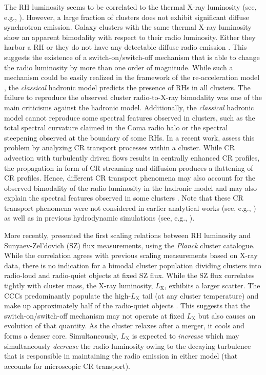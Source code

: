 \documentclass[traditabstract]{aa}
\newcommand{\rmn}{\mathrm}
\begin{document}
The RH luminosity seems to be correlated to the thermal X-ray luminosity (see,
e.g., \citealp{2009A&A...507..661B,2011A&A...527A..99E}).  However, a large
fraction of clusters does not exhibit significant diffuse synchrotron
emission. Galaxy clusters with the same thermal X-ray luminosity show an
apparent bimodality with respect to their radio luminosity. Either they harbor a
RH or they do not have any detectable diffuse radio emission
\citep{2009A&A...507..661B,2011A&A...527A..99E}.  This suggests the existence
of a switch-on/switch-off mechanism that is able to change the radio luminosity
by more than one order of magnitude.  While such a mechanism could be easily
realized in the framework of the re-acceleration model
\citep{2009A&A...507..661B}, the \emph{classical} hadronic model predicts the
presence of RHs in all clusters. The failure to reproduce the observed cluster
radio-to-X-ray bimodality was one of the main criticisms against the hadronic
model. Additionally, the \emph{classical} hadronic model cannot reproduce some
spectral features observed in clusters, such as the total spectral curvature
claimed in the Coma radio halo or the spectral steepening observed at the
boundary of some RHs. In a recent work, \cite{2011A&A...527A..99E} assess this
problem by analyzing CR transport processes within a cluster. While CR advection
with turbulently driven flows results in centrally enhanced CR profiles, the
propagation in form of CR streaming and diffusion produces a flattening of CR
profiles. Hence, different CR transport phenomena may also account for the
observed bimodality of the radio luminosity in the hadronic model and may also
explain the spectral features observed in some clusters
\citep{2011A&A...527A..99E}. Note that these CR transport phenomena were not
considered in earlier analytical works (see, e.g., \citealp{2004A&A...413...17P})
as well as in previous hydrodynamic simulations (see,
e.g., \citealp{2001ApJ...562..233M, 2008MNRAS.385.1211P, 2010MNRAS.409..449P}).

More recently, \cite{2012MNRAS.421L.112B} presented the first scaling relations
between RH luminosity and Sunyaev-Zel'dovich (SZ) flux measurements, using the
\emph{Planck} cluster catalogue. While the correlation agrees with previous
scaling measurements based on X-ray data, there is no indication for a bimodal
cluster population dividing clusters into radio-loud and radio-quiet objects at
fixed SZ flux. While the SZ flux correlates tightly with cluster mass, the X-ray
luminosity, $L_\rmn{X}$, exhibits a larger scatter. The CCCs predominantly
populate the high-$L_\rmn{X}$ tail (at any cluster temperature) and make up
approximately half of the radio-quiet objects \citep{2011A&A...527A..99E}. This
suggests that the switch-on/switch-off mechanism may not operate at fixed
$L_\rmn{X}$ but also causes an evolution of that quantity. As the cluster
relaxes after a merger, it cools and forms a denser core. Simultaneously,
$L_\rmn{X}$ is expected to {\em increase} which may simultaneously {\em
  decrease} the radio luminosity owing to the decaying turbulence that is
responsible in maintaining the radio emission in either model (that accounts for
microscopic CR transport).
 
\end{document}
